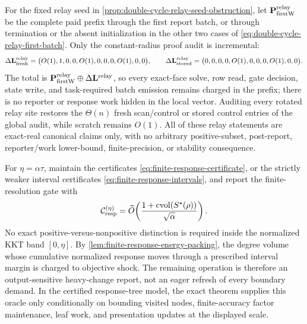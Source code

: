 \begin{remark}
For the fixed relay seed in
\cref{prop:double-cycle-relay-seed-obstruction}, let
$\mathbf P^{\rm relay}_{\rm firstW}$ be the complete paid prefix through the
first report batch, or through termination or the absent initialization in
the other two cases of \cref{eq:double-cycle-relay-first-batch}.  Only the
constant-radius proof audit is incremental:
\begin{equation}
 \Delta\mathbf L^{\rm relay}_{\rm fresh}
 =\bigl(O(1),1,0,0,O(1),0,0,0,O(1),0,0\bigr),
 \qquad
 \Delta\mathbf L^{\rm relay}_{\rm stored}
 =\bigl(0,0,0,0,O(1),0,0,0,O(1),0,0\bigr).
 \label{eq:double-cycle-relay-audit-vectors}
\end{equation}
The total is
$\mathbf P^{\rm relay}_{\rm firstW}\oplus
\Delta\mathbf L^{\rm relay}$, so every exact-face solve, row read, gate
decision, state write, and task-required batch emission remains charged in
the prefix; there is no reporter or response work hidden in the local vector.
Auditing every rotated relay site restores the $\Theta(n)$ fresh scan/control
or stored control entries of the global audit, while scratch remains $O(1)$.
All of these relay statements are exact-real canonical claims only, with no
arbitrary positive-subset, post-report, reporter/work lower-bound,
finite-precision, or stability consequence.
\end{remark}

\begin{problem}
\label{prob:finite-resolution-response}
For $\eta=\alpha\tau$, maintain the certificates
\cref{eq:finite-response-certificate}, or the strictly weaker interval
certificates \cref{eq:finite-response-intervals}, and report the
finite-resolution gate
with
\begin{equation}
 \mathcal C_{\rm resp}^{(\eta)}
 =\widetilde O\!\left(
  \frac{1+\operatorname{cvol}(S^\star(\rho))}{\sqrt\alpha}
 \right).
 \label{eq:finite-resolution-response-target}
\end{equation}
No exact positive-versus-nonpositive distinction is required inside the
normalized KKT band $[0,\eta]$.  By
\cref{lem:finite-response-energy-packing}, the degree volume whose cumulative
normalized response moves through a prescribed interval margin is charged to
objective shock.  The remaining operation is therefore an output-sensitive
heavy-change report, not an eager refresh of every boundary demand.  In the
certified response-tree model, the exact theorem supplies this oracle only
conditionally on bounding visited nodes, finite-accuracy factor maintenance,
leaf work, and presentation updates at the displayed scale.
\end{problem}

